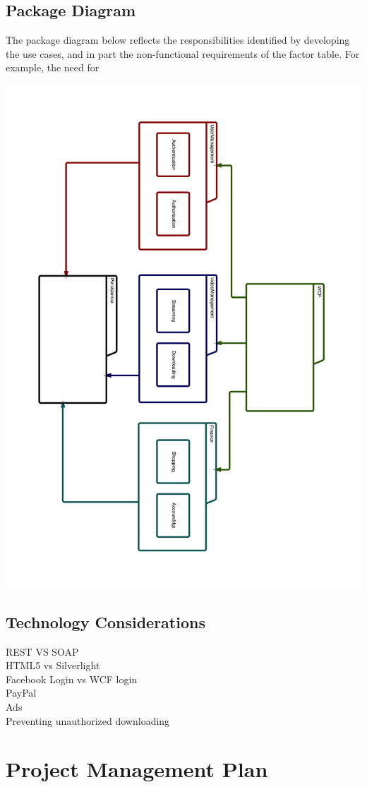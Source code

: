 \subsection{Package Diagram}
The package diagram below reflects the responsibilities identified by developing the use cases, and in part the non-functional requirements of the factor table. For example, the need for 
\begin{center}
\includegraphics[scale=0.15]{PackageDiagram.png}
\end{center}
\subsection{Technology Considerations}
REST VS SOAP\\
HTML5 vs Silverlight\\
Facebook Login vs WCF login\\
PayPal\\
Ads\\
Preventing unauthorized downloading\\
\section{Project Management Plan}